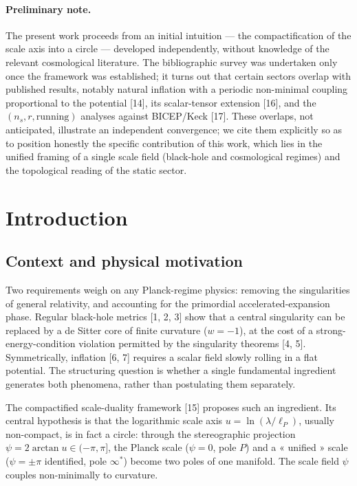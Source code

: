 \documentclass[11pt,a4paper]{article}
\theoremstyle{plain}
\theoremstyle{remark}
\begin{document}
\paragraph{Preliminary note.} The present work proceeds from an initial intuition --- the
compactification of the scale axis into a circle --- developed independently, without
knowledge of the relevant cosmological literature. The bibliographic survey was undertaken
only once the framework was established; it turns out that certain sectors overlap with
published results, notably natural inflation with a periodic non-minimal coupling
proportional to the potential [14], its scalar-tensor extension [16], and the
$(n_s,r,\text{running})$ analyses against BICEP/Keck [17]. These overlaps, not anticipated,
illustrate an independent convergence; we cite them explicitly so as to position honestly
the specific contribution of this work, which lies in the unified framing of a single scale
field (black-hole and cosmological regimes) and the topological reading of the static sector.

\section{Introduction}
\subsection{Context and physical motivation}
Two requirements weigh on any Planck-regime physics: removing the singularities of general
relativity, and accounting for the primordial accelerated-expansion phase. Regular
black-hole metrics [1, 2, 3] show that a central singularity can be replaced by a de Sitter
core of finite curvature ($w=-1$), at the cost of a strong-energy-condition violation
permitted by the singularity theorems [4, 5]. Symmetrically, inflation [6, 7] requires a
scalar field slowly rolling in a flat potential. The structuring question is whether a single
fundamental ingredient generates both phenomena, rather than postulating them separately.

The compactified scale-duality framework [15] proposes such an ingredient. Its central
hypothesis is that the logarithmic scale axis $u=\ln(\lambda/\ell_P)$, usually non-compact,
is in fact a circle: through the stereographic projection $\psi=2\arctan u\in(-\pi,\pi]$, the
Planck scale ($\psi=0$, pole $P$) and a « unified » scale ($\psi=\pm\pi$ identified, pole
$\infty^*$) become two poles of one manifold. The scale field $\psi$ couples non-minimally
to curvature.
\end{document}
